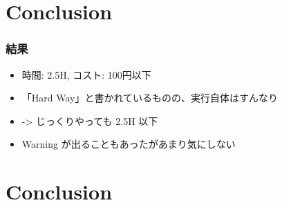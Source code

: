 \documentclass[aspectratio=169,11pt,hyperref={colorlinks=true}]{beamer}
\begin{document}
\section{Conclusion}
\begin{frame}
  \frametitle{結果}
  \begin{itemize}
    \item 時間: 2.5H, コスト: 100円以下
    \item 「Hard Way」と書かれているものの、実行自体はすんなり
    \item[]  -> じっくりやっても 2.5H 以下
    \item Warning が出ることもあったがあまり気にしない
  \end{itemize}
\end{frame}

\section{Conclusion}
\end{document}
